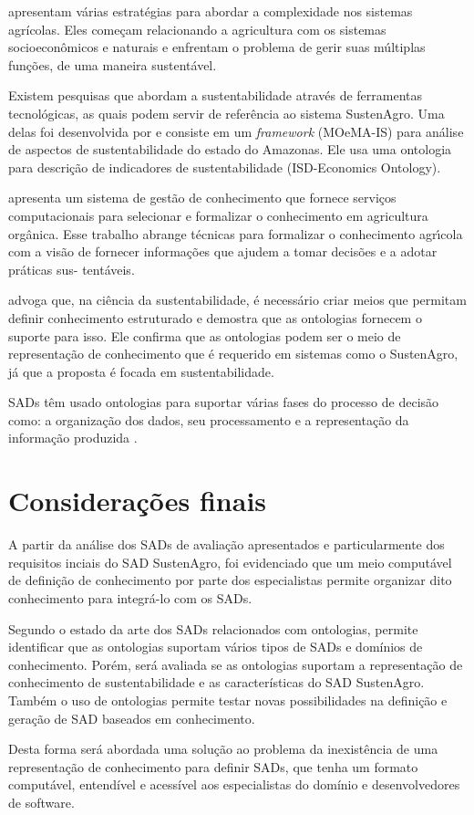 \citet{Ewert2009546} apresentam várias estratégias para abordar a
complexidade nos sistemas agrícolas. Eles começam relacionando a agricultura
com os sistemas socioeconômicos e naturais e enfrentam o problema
de gerir suas múltiplas funções, de uma maneira sustentável.

Existem pesquisas que abordam a sustentabilidade através de ferramentas
tecnológicas, as quais podem servir de referência ao sistema SustenAgro.
Uma delas foi desenvolvida por \citep{brilhante:2006} e consiste
em um \emph{framework} (MOeMA-IS) para análise de aspectos de sustentabilidade
do estado do Amazonas. Ele usa uma ontologia para descrição de indicadores
de sustentabilidade (\foreignlanguage{english}{ISD-Economics Ontology}).

\citet{soulignac2012knowledge} apresenta um sistema de gestão de
conhecimento que fornece serviços computacionais para selecionar e
formalizar o conhecimento em agricultura orgânica. Esse trabalho abrange
técnicas para formalizar o conhecimento agr\'{ı}cola com a visão de
fornecer informações que ajudem a tomar decisões e a adotar práticas
sus- tentáveis. 

\citet{kumazawa2009toward} advoga que, na ciência da sustentabilidade,
é necessário criar meios que permitam definir conhecimento estruturado
e demostra que as ontologias fornecem o suporte para isso. Ele confirma
que as ontologias podem ser o meio de representação de conhecimento
que é requerido em sistemas como o SustenAgro, já que a proposta é
focada em sustentabilidade.

SADs têm usado ontologias para suportar várias fases do processo de
decisão como: a organização dos dados, seu processamento e a representação
da informação produzida \citep{Rospocher:2012:ODS:2887638.2887644}.


\section{Considerações finais}

A partir da análise dos SADs de avaliação apresentados e particularmente
dos requisitos inciais do SAD SustenAgro, foi evidenciado que um meio
computável de definição de conhecimento por parte dos especialistas
permite organizar dito conhecimento para integrá-lo com os SADs.

Segundo o estado da arte dos SADs relacionados com ontologias, permite
identificar que as ontologias suportam vários tipos de SADs e domínios
de conhecimento. Porém, será avaliada se as ontologias suportam a
representação de conhecimento de sustentabilidade e as características
do SAD SustenAgro. Também o uso de ontologias permite testar novas
possibilidades na definição e geração de SAD baseados em conhecimento.

Desta forma será abordada uma solução ao problema da inexistência
de uma representação de conhecimento para definir SADs, que tenha
um formato computável, entendível e acessível aos especialistas do
domínio e desenvolvedores de software.
